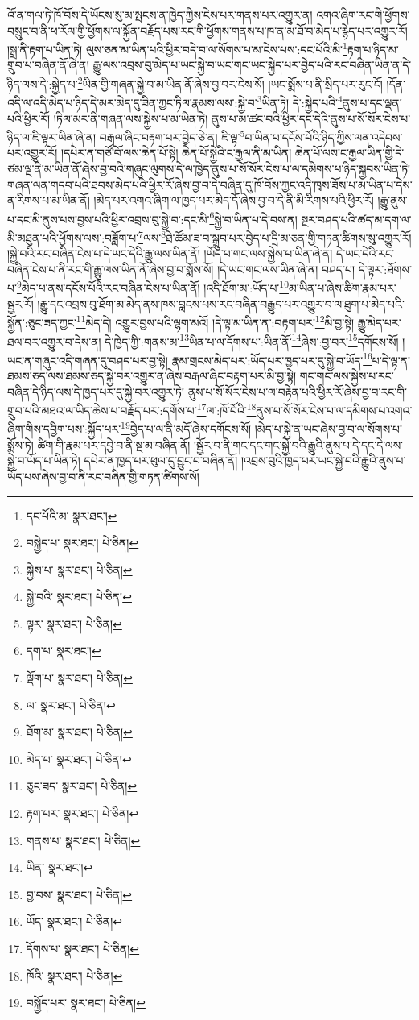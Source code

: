 འོ་ན་གལ་ཏེ་ཁོ་བོས་དེ་ཡོངས་སུ་མ་སྤངས་ན་ཁྱེད་ཀྱིས་ངེས་པར་གནས་པར་འགྱུར་ན། འགའ་ཞིག་རང་གི་ཕྱོགས་བསྲུང་བ་ནི་ཕ་རོལ་གྱི་ཕྱོགས་ལ་སྐྱོན་བརྗོད་པས་རང་གི་ཕྱོགས་གནས་པ་ཁ་ན་མ་ཐོ་བ་མེད་པ་རྙེད་པར་འགྱུར་རོ། །སྒྲ་ནི་རྟག་པ་ཡིན་ཏེ། ལུས་ཅན་མ་ཡིན་པའི་ཕྱིར་བདེ་བ་ལ་སོགས་པ་མ་ངེས་པས་:དང་པོའི་མི་\footnote{དང་པོའི་མ་  སྣར་ཐང་། }རྟག་པ་ཉིད་མ་གྲུབ་པ་བཞིན་ནོ་ཞེ་ན། རྒྱུ་ལས་འབྲས་བུ་མེད་པ་ཡང་སྐྱེ་བ་ཡང་གང་ཡང་སྐྱེད་པར་བྱེད་པའི་རང་བཞིན་ཡིན་ན་དེ་ཉིད་ལས་དེ་:སྐྱེད་པ་\footnote{བསྐྱེད་པ་  སྣར་ཐང་།  པེ་ཅིན། }ཡིན་གྱི་གཞན་སྐྱེ་བ་མ་ཡིན་ནོ་ཞེས་བྱ་བར་ངེས་སོ། །ཡང་སྨོས་པ་ནི་སྲིད་པར་རུང་ངོ། །དོན་འདི་ལ་འདི་མེད་པ་ཉིད་དེ་མར་མེད་དུ་ཟིན་ཀྱང་ཏིལ་རྣམས་ལས་:སྐྱེ་བ་\footnote{སྐྱེས་པ་  སྣར་ཐང་།  པེ་ཅིན། }ཡིན་ཏེ། དེ་:སྐྱེད་པའི་\footnote{སྐྱེ་བའི་  སྣར་ཐང་།  པེ་ཅིན། }ནུས་པ་དང་ལྡན་པའི་ཕྱིར་རོ། །ཏིལ་མར་ནི་གཞན་ལས་སྐྱེས་པ་མ་ཡིན་ཏེ། ནུས་པ་མ་ཚང་བའི་ཕྱིར་དང་དེའི་ནུས་པ་སོ་སོར་ངེས་པ་ཉིད་ལ་ཇི་ལྟར་ཡིན་ཞེ་ན། བརྒལ་ཞིང་བརྟག་པར་བྱེད་ཅེ་ན། ཇི་ལྟ་\footnote{ལྟར་  སྣར་ཐང་།  པེ་ཅིན། }བ་ཡིན་པ་དངོས་པོའི་ཉིད་ཀྱིས་ལན་འདེབས་པར་འགྱུར་རོ། །དཔེར་ན་གཙོ་བོ་ལས་ཆེན་པོ་སྟེ། ཆེན་པོ་སྐྱེའི་ང་རྒྱལ་ནི་མ་ཡིན། ཆེན་པོ་ལས་ང་རྒྱལ་ཡིན་གྱི་དེ་ཙམ་ལྔ་ནི་མ་ཡིན་ནོ་ཞེས་བྱ་བའི་གཞུང་ལུགས་དེ་ལ་ཁྱེད་ནུས་པ་སོ་སོར་ངེས་པ་ལ་དམིགས་པ་ཉིད་སྐྱབས་ཡིན་ཏེ། གཞན་ལན་གདབ་པའི་ཐབས་མེད་པའི་ཕྱིར་རོ་ཞེས་བྱ་བ་དེ་བཞིན་དུ་ཁོ་བོས་ཀྱང་འདི་ཁྭས་ཟོས་པ་མ་ཡིན་པ་དེས་ན་རིགས་པ་མ་ཡིན་ནོ། །མེད་པར་འགའ་ཞིག་ལ་ཁྱད་པར་མེད་དོ་ཞེས་བྱ་བ་དེ་ནི་མི་རིགས་པའི་ཕྱིར་རོ། །རྒྱུ་ནུས་པ་དང་མི་ནུས་པས་བྱས་པའི་ཕྱིར་འབྲས་བུ་སྐྱེ་བ་:དང་མི་\footnote{དག་པ་  སྣར་ཐང་། }སྐྱེ་བ་ཡིན་པ་དེ་བས་ན། སྔར་བཤད་པའི་ཚད་མ་དག་ལ་མི་མཐུན་པའི་ཕྱོགས་ལས་:བཟློག་པ་\footnote{ལྡོག་པ་  སྣར་ཐང་།  པེ་ཅིན། }ལས་\footnote{ལ་  སྣར་ཐང་།  པེ་ཅིན། }ཐེ་ཚོམ་ཟ་བ་སྒྲུབ་པར་བྱེད་པ་དྲི་མ་ཅན་གྱི་གཏན་ཚིགས་སུ་འགྱུར་རོ། །སྐྱེ་བའི་རང་བཞིན་ངེས་པ་དེ་ཡང་དེའི་རྒྱུ་ལས་ཡིན་ནོ། །ཡོད་པ་གང་ལས་སྐྱེས་པ་ཡིན་ཞེ་ན། དེ་ཡང་དེའི་རང་བཞིན་ངེས་པ་ནི་རང་གི་རྒྱུ་ལས་ཡིན་ནོ་ཞེས་བྱ་བ་སྨོས་སོ། །དེ་ཡང་གང་ལས་ཡིན་ཞེ་ན། བཤད་པ། དེ་ལྟར་:ཐོགས་པ་\footnote{ཐོག་མ་  སྣར་ཐང་།  པེ་ཅིན། }མེད་པ་ནས་དངོས་པོའི་རང་བཞིན་ངེས་པ་ཡིན་ནོ། །འདི་ཐོག་མ་:ཡོད་པ་\footnote{མེད་པ་  སྣར་ཐང་།  པེ་ཅིན། }མ་ཡིན་པ་ཞེས་ཚིག་རྣམ་པར་སྦྱར་རོ། །རྒྱུ་དང་འབྲས་བུ་ཐོག་མ་མེད་ནས་ཁས་བླངས་པས་རང་བཞིན་བརྒྱུད་པར་འགྱུར་བ་ལ་ཐུག་པ་མེད་པའི་སྐྱོན་:ཅུང་ཟད་ཀྱང་\footnote{ཅུང་ཟད་  སྣར་ཐང་།  པེ་ཅིན། }མེད་དེ། འགྱུར་བྱས་པའི་ལྷག་མའོ། །དེ་ལྟ་མ་ཡིན་ན་:བརྟག་པར་\footnote{རྟག་པར་  སྣར་ཐང་།  པེ་ཅིན། }མི་བྱ་སྟེ། རྒྱུ་མེད་པར་ཐལ་བར་འགྱུར་བ་དེས་ན། དེ་ཁྱེད་ཀྱི་:གནས་མ་\footnote{གནས་པ་  སྣར་ཐང་།  པེ་ཅིན། }ཡིན་པ་ལ་དོགས་པ་:ཡིན་ནོ་\footnote{ཡིན་  སྣར་ཐང་། }ཞེས་:བྱ་བར་\footnote{བྱ་བས་  སྣར་ཐང་།  པེ་ཅིན། }དགོངས་སོ། །ཡང་ན་གཞུང་འདི་གཞན་དུ་བཤད་པར་བྱ་སྟེ། རྣམ་གྲངས་མེད་པར་:ཡོད་པར་ཁྱད་པར་དུ་སྐྱེ་བ་ཡོད་\footnote{ཡོད་  སྣར་ཐང་།  པེ་ཅིན། }པ་དེ་ལྟ་ན་ཐམས་ཅད་ལས་ཐམས་ཅད་སྐྱེ་བར་འགྱུར་ན་ཞེས་བརྒལ་ཞིང་བརྟག་པར་མི་བྱ་སྟེ། གང་གང་ལས་སྐྱེས་པ་རང་བཞིན་དེ་ཉིད་ལས་དེ་ཁྱད་པར་དུ་སྐྱེ་བར་འགྱུར་ཏེ། ནུས་པ་སོ་སོར་ངེས་པ་ལ་བརྟེན་པའི་ཕྱིར་རོ་ཞེས་བྱ་བ་རང་གི་གྲུབ་པའི་མཐའ་ལ་ཡིད་ཆེས་པ་བརྗོད་པར་:དགོས་པ་\footnote{དོགས་པ་  སྣར་ཐང་།  པེ་ཅིན། }ལ་:ཁོ་བོའི་\footnote{ཁོའི་  སྣར་ཐང་།  པེ་ཅིན། }ནུས་པ་སོ་སོར་ངེས་པ་ལ་དམིགས་པ་འགའ་ཞིག་གིས་དབྱིག་པས་:སྐྱོད་པར་\footnote{བསྐྱོད་པར་  སྣར་ཐང་།  པེ་ཅིན། }བྱེད་པ་ལ་ནི་མདོ་ཞེས་དགོངས་སོ། །མེད་པ་སྐྱེ་ན་ཡང་ཞེས་བྱ་བ་ལ་སོགས་པ་སྨོས་ཏེ། ཚིག་གི་རྣམ་པར་དབྱེ་བ་ནི་སྔ་མ་བཞིན་ནོ། །སྦྱོར་བ་ནི་གང་དང་གང་སྐྱེ་བའི་རྒྱུའི་ནུས་པ་དེ་དང་དེ་ལས་སྐྱེ་བ་ཡོད་པ་ཡིན་ཏེ། དཔེར་ན་ཁྱད་པར་ཕུལ་དུ་བྱུང་བ་བཞིན་ནོ། །འབྲས་བུའི་ཁྱད་པར་ཡང་སྐྱེ་བའི་རྒྱུའི་ནུས་པ་ཡོད་པས་ཞེས་བྱ་བ་ནི་རང་བཞིན་གྱི་གཏན་ཚིགས་སོ། 